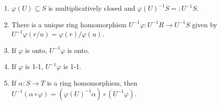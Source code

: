 \begin{proposition}
    \begin{enumerate}
        \item $\varphi(U) \subseteq S$ is multiplicatively closed and $\varphi(U)^{-1}S =: U^{-1}S$.
        \item There is a unique ring homomorphism $U^{-1}\varphi: U^{-1}R \to U^{-1}S$ given by $U^{-1}\varphi(r/u) = \varphi(r)/\varphi(u)$.
            \begin{center}
            \end{center}
        \item If $\varphi$ is onto, $U^{-1}\varphi$ is onto.
        \item If $\varphi$ is 1-1, $U^{-1}\varphi$ is 1-1.
        \item If $\alpha: S \to T$ is a ring homomorphism, then $U^{-1}(\alpha \circ \varphi) = (\varphi(U)^{-1}\alpha) \circ (U^{-1}\varphi)$. 
            \begin{center}
            \end{center}
    \end{enumerate}
\end{proposition}

